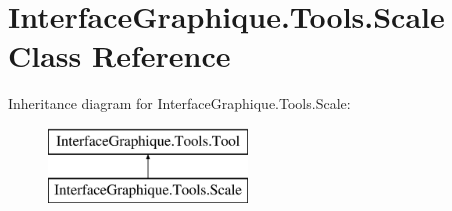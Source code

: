 \hypertarget{class_interface_graphique_1_1_tools_1_1_scale}{}\section{Interface\+Graphique.\+Tools.\+Scale Class Reference}
\label{class_interface_graphique_1_1_tools_1_1_scale}
Inheritance diagram for Interface\+Graphique.\+Tools.\+Scale\+:\begin{figure}[H]
\begin{center}
\leavevmode
\includegraphics[height=2.000000cm]{class_interface_graphique_1_1_tools_1_1_scale}
\end{center}
\end{figure}
